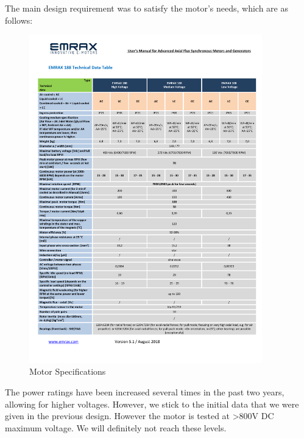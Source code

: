 The main design requirement was to satisfy the motor's needs, which are as follows:
\begin{figure}[H]
    \centering
    \includegraphics[width=0.9\textwidth]{texfiles/mech/eimg/propulsion/table_motor}
    \caption{Motor Specifications}
    \label{fig: Motor Specifications}
\end{figure}
The power ratings have been increased several times in the past two years, allowing for higher voltages. However, we stick to the initial data that we were given in the previous design. However the motor is tested at >800V DC maximum voltage. We will definitely not reach these levels.

